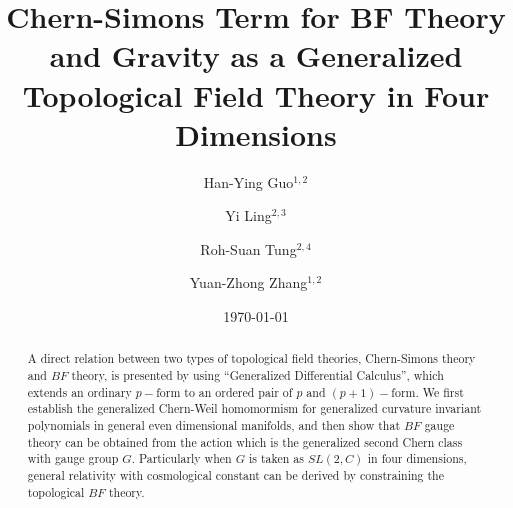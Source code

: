 \documentclass[a4paper,twocolumn,showpacs,prd]{revtex4}
\begin{document}

\title{Chern-Simons Term for BF Theory and
Gravity as a Generalized \\Topological Field Theory in Four
Dimensions}

\author{Han-Ying Guo${}^{1,2}$}

\author{Yi Ling${}^{2,3}$}

\author{Roh-Suan Tung${}^{2,4}$}

\author{Yuan-Zhong Zhang${}^{1,2}$}






\date{\today}

\begin{abstract}
\quad A direct relation between two types of topological field
theories, Chern-Simons theory and $BF$ theory, is presented by
using ``Generalized Differential Calculus'', which extends an
ordinary $p-$form to an ordered pair of $p$ and $(p+1)-$form. We
first establish the generalized Chern-Weil homomormism for
generalized curvature invariant polynomials in general even
dimensional manifolds, and then show that $BF$ gauge theory can be
obtained from the action which is the generalized second Chern
class with gauge group $G$. Particularly when $G$ is taken as
$SL(2,C)$ in four dimensions, general relativity with cosmological
constant can be derived by constraining the topological $BF$
theory.
\end{abstract}


\keywords{}

\maketitle


\newcommand{\GForm}[2]{\buildrel\scriptstyle {#1} \over {\bf #2}}
\newcommand{\Form}[2]{\buildrel\scriptstyle {#1} \over #2}
\newcommand{\Gd}{{\bf d}}
\end{document}
